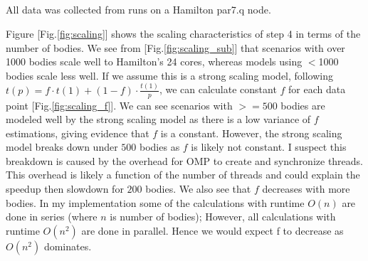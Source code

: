 \subsection{}
All data was collected from runs on a Hamilton par7.q node.

Figure [Fig.\ref{fig:scaling}] shows the scaling characteristics of step 4 in terms of the number of bodies. 
We see from [Fig.\ref{fig:scaling_sub}] that scenarios with over 1000 bodies scale well to Hamilton's 24 cores, whereas models using $<$1000 bodies scale less well. 
If we assume this is a strong scaling model, following $t(p) = f \cdot t(1) + (1-f)\cdot \frac{t(1)}{p}$, we can calculate constant $f$ for each data point [Fig.\ref{fig:scaling_f}]. We can see scenarios with $>=500$ bodies are modeled well by the strong scaling model as there is a low variance of $f$ estimations, giving evidence that $f$ is a constant. 
However, the strong scaling model breaks down under $500$ bodies as $f$ is likely not constant. 
I suspect this breakdown is caused by the overhead for OMP to create and synchronize threads. 
This overhead is likely a function of the number of threads and could explain the speedup then slowdown for $200$ bodies.
We also see that $f$ decreases with more bodies. In my implementation some of the calculations with runtime $O(n)$ are done in series (where $n$ is number of bodies); However, all calculations with runtime $O(n^2)$ are done in parallel. Hence we would expect f to decrease as $O(n^2)$ dominates.

\subsection{}
